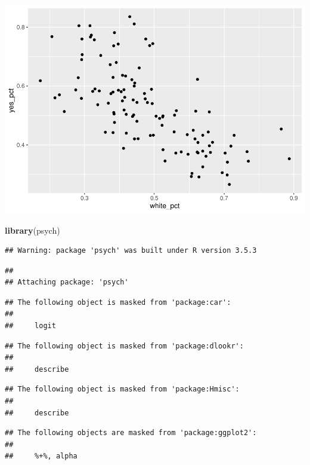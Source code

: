 \documentclass[
]{article}
\newenvironment{Shaded}{\begin{snugshade}}{\end{snugshade}}
\newcommand{\KeywordTok}[1]{\textcolor[rgb]{0.13,0.29,0.53}{\textbf{#1}}}
\newcommand{\NormalTok}[1]{#1}
\begin{document}
\includegraphics{Zhong_paper_files/figure-latex/unnamed-chunk-2-1.pdf}

\begin{Shaded}
\begin{Highlighting}[]
\KeywordTok{library}\NormalTok{(psych)}
\end{Highlighting}
\end{Shaded}

\begin{verbatim}
## Warning: package 'psych' was built under R version 3.5.3
\end{verbatim}

\begin{verbatim}
## 
## Attaching package: 'psych'
\end{verbatim}

\begin{verbatim}
## The following object is masked from 'package:car':
## 
##     logit
\end{verbatim}

\begin{verbatim}
## The following object is masked from 'package:dlookr':
## 
##     describe
\end{verbatim}

\begin{verbatim}
## The following object is masked from 'package:Hmisc':
## 
##     describe
\end{verbatim}

\begin{verbatim}
## The following objects are masked from 'package:ggplot2':
## 
##     %+%, alpha
\end{verbatim}
\end{document}
